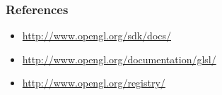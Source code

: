 \begin{frame}
  \frametitle{References}
  \begin{itemize}
    \item \url{http://www.opengl.org/sdk/docs/}
    \item \url{http://www.opengl.org/documentation/glsl/}
    \item \url{http://www.opengl.org/registry/}
  \end{itemize}
\end{frame}

